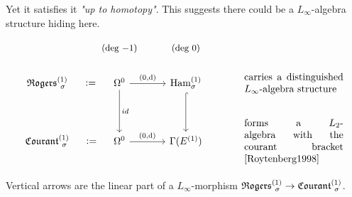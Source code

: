 \documentclass[beamer,10pt]{standalone}
\begin{document}
\begin{frame}
	Yet it satisfies it \emph{"up to homotopy"}. This suggests there could be a $L_\infty$-algebra structure hiding here.
	\vfill

	\seprule
	\begin{displaymath}
		\begin{tikzcd}[ampersand replacement=\&]
			\& \text{\small (deg $-1$)} \& \text{\small (deg $0$)} \\[-.5em]
			\Rogers[\sigma]{1}   \ar[r,phantom,":="]
			\&
			\Omega^0 \ar[r,"{(0,\d)}"] \ar[d,"id"]
			\& \Ham_{\sigma}^{(1)} \ar[d,hook]
			\&[1em] \parbox{10em}{carries a distinguished $L_\infty$-algebra structure}
			\\
			\Courant[\sigma]{1} \ar[r,phantom,":="]
			\& \Omega^0 \ar[r,"{(0,\d)}"]
			\& \Gamma(E^{(1)}) \&
			\parbox{10em}{forms a $L_2$-algebra with the courant bracket \cite{Roytenberg1998}}
		\end{tikzcd}
	\end{displaymath}
	\vfill

	Vertical arrows are the linear part of a $L_\infty$-morphism $\Rogers[\sigma]{1} \to \Courant[\sigma]{1}$.
\end{frame}
\end{document}
